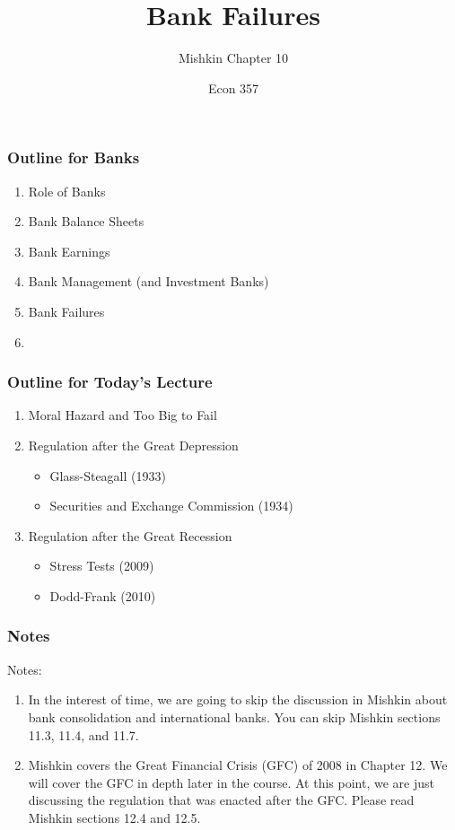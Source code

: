 \documentclass{beamer}
\title{Bank Failures}
\subtitle{Mishkin Chapter 10}
\author{Econ 357}
\date{\week}
\begin{document}
\frame{\titlepage}

\begin{frame}
    \frametitle{Outline for Banks}
        \begin{enumerate}
            \item Role of Banks
            \item Bank Balance Sheets
            \item Bank Earnings
            \item Bank Management (and Investment Banks)
            \item Bank Failures
            \item {}
        \end{enumerate}
\end{frame}


\begin{frame}
    \frametitle{Outline for Today's Lecture}
    
    \begin{enumerate}
        \item Moral Hazard and Too Big to Fail
        \item Regulation after the Great Depression
        \begin{itemize}
            \item Glass-Steagall (1933)
            \item Securities and Exchange Commission (1934)
        \end{itemize}
        \item Regulation after the Great Recession
        \begin{itemize}
            \item Stress Tests (2009)
            \item Dodd-Frank (2010)
        \end{itemize}
    \end{enumerate}

\end{frame}


\begin{frame}
\frametitle{Notes}

Notes:

    \begin{enumerate}
        \item In the interest of time, we are going to skip the discussion in Mishkin about bank consolidation and international banks.   You can skip Mishkin sections 11.3, 11.4, and 11.7.
        \item Mishkin covers the Great Financial Crisis (GFC) of 2008 in Chapter 12.   We will cover the GFC in depth later in the course.   At this point, we are just discussing the regulation that was enacted after the GFC.  Please read Mishkin sections 12.4 and 12.5.
    \end{enumerate}

\end{frame}
\end{document}
